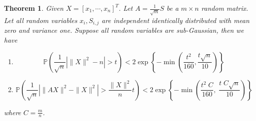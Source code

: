 \documentclass[12pt]{extarticle}
\newtheorem{theorem}{Theorem}
\newcommand{\field}[1]{\mathbb{#1}}
\newcommand{\1}{\field{1}}
\newcommand{\p}{\field{P}}
\numberwithin{equation}{section}
\begin{document}


\bigskip
\begin{theorem}\label{thm:RP norm concentration}
Given $X= [x_1,\cdots,x_n]^T$. Let $A=\frac{1}{\sqrt{m}} S$ be a $m\times n$ random matrix. Let all random variables $x_i, S_{i,j}$ are independent identically distributed with mean zero and variance one. Suppose all random variables are sub-Gaussian, then we have 
\begin{enumerate}
\item 
    \begin{equation}\label{eqn:two side tail sum squares of subgaussian}
    \p \left( \frac{1}{\sqrt{n}} \left|  \|X\|^2 -n \right|> t \right) < 2\exp\left\{ {- \min(\frac{t^2}{160}, \frac{t\sqrt{n}}{10}) }  \right\}
    \end{equation}
\item 
    \begin{equation} \label{eqn:tail of random norm to random projected norm}
     \p \left(  \frac{1}{\sqrt{n}} \left| \|AX\|^2 - \|X\|^2 \right|> \frac{\|X\|^2}{n} t \right) 
     < 2 \exp \left\{ -\min \left(   \frac{t^2 \; C}{160} , \; { \frac{t \; C \sqrt{n}}{10} }  \right) \right\}
    \end{equation}

\end{enumerate}
    
where $C= \frac{m}{n}$.

\end{theorem}
\end{document}
